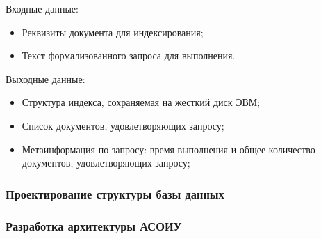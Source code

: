Входные данные:
\begin{itemize}
\item Реквизиты документа для индексирования;
\item Текст формализованного запроса для выполнения.
\end{itemize}

Выходные данные:
\begin{itemize}
\item Структура индекса, сохраняемая на жесткий диск ЭВМ;
\item Список документов, удовлетворяющих запросу;
\item Метаинформация по запросу: время выполнения и общее количество документов, удовлетворяющих запросу;
\end{itemize}

\subsubsection{Проектирование структуры базы данных}
\subsubsection{Разработка архитектуры АСОИУ}
